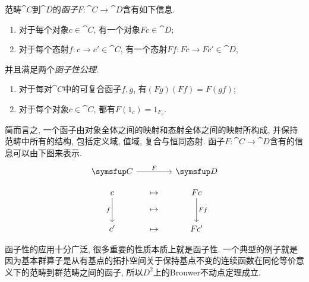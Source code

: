 范畴$\cat{C}$到$\cat{D}$的\emph{函子}$F\colon \cat{C}\to \cat{D}$含有如下信息.
\begin{enumerate}
  \item 对于每个对象$c\in\cat{C}$, 有一个对象$Fc\in \cat{D}$;
  \item 对于每个态射$f\colon c\to c'\in\cat{C}$, 有一个态射$Ff\colon Fc\to Fc'\in\cat{D}$,
\end{enumerate}
并且满足两个\emph{函子性公理}.
\begin{enumerate}
  \item 对于每对$\cat{C}$中的可复合函子$f, g$, 有$(Fg)(Ff)=F(gf)$;
  \item 对于每个对象$c\in\cat{C}$, 都有$F(1_c)=1_{F_c}$.
\end{enumerate}
简而言之, 一个函子由对象全体之间的映射和态射全体之间的映射所构成, 并保持范畴中所有的结构, 包括定义域, 值域, 复合与恒同态射. 函子$F\colon \cat{C}\to \cat{D}$含有的信息可以由下图来表示.
\begin{equation}
  \functordiagram{\cat{C}}{\cat{D}}{F}{c}{c'}{f}{Fc}{Fc'}{Ff}
\end{equation}

函子性的应用十分广泛, 很多重要的性质本质上就是函子性. 一个典型的例子就是因为基本群算子是从有基点的拓扑空间关于保持基点不变的连续函数在同伦等价意义下的范畴到群范畴之间的函子, 所以$D^2$上的Brouwer不动点定理成立.

